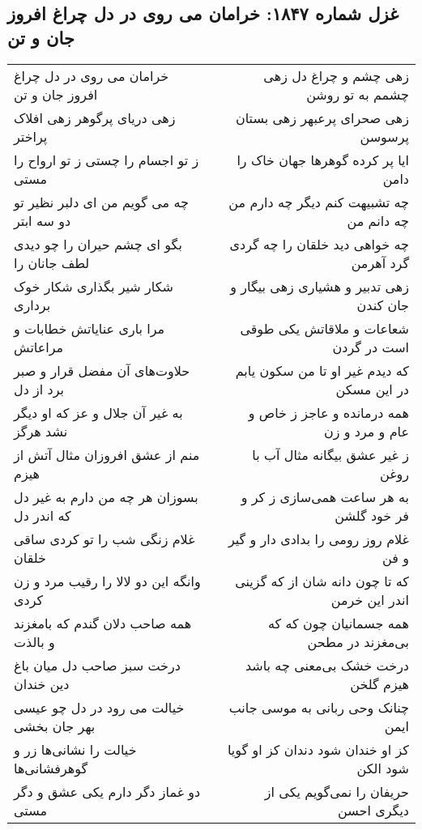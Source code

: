 \begin{center}
\section*{غزل شماره ۱۸۴۷: خرامان می روی در دل چراغ افروز جان و تن}
\label{sec:1847}
\begin{longtable}{l p{0.5cm} r}
خرامان می روی در دل چراغ افروز جان و تن
&&
زهی چشم و چراغ دل زهی چشمم به تو روشن
\\
زهی دریای پرگوهر زهی افلاک پراختر
&&
زهی صحرای پرعبهر زهی بستان پرسوسن
\\
ز تو اجسام را چستی ز تو ارواح را مستی
&&
ایا پر کرده گوهرها جهان خاک را دامن
\\
چه می گویم من ای دلبر نظیر تو دو سه ابتر
&&
چه تشبیهت کنم دیگر چه دارم من چه دانم من
\\
بگو ای چشم حیران را چو دیدی لطف جانان را
&&
چه خواهی دید خلقان را چه گردی گرد آهرمن
\\
شکار شیر بگذاری شکار خوک برداری
&&
زهی تدبیر و هشیاری زهی بیگار و جان کندن
\\
مرا باری عنایاتش خطابات و مراعاتش
&&
شعاعات و ملاقاتش یکی طوقی است در گردن
\\
حلاوت‌های آن مفضل قرار و صبر برد از دل
&&
که دیدم غیر او تا من سکون یابم در این مسکن
\\
به غیر آن جلال و عز که او دیگر نشد هرگز
&&
همه درمانده و عاجز ز خاص و عام و مرد و زن
\\
منم از عشق افروزان مثال آتش از هیزم
&&
ز غیر عشق بیگانه مثال آب با روغن
\\
بسوزان هر چه من دارم به غیر دل که اندر دل
&&
به هر ساعت همی‌سازی ز کر و فر خود گلشن
\\
غلام زنگی شب را تو کردی ساقی خلقان
&&
غلام روز رومی را بدادی دار و گیر و فن
\\
وانگه این دو لالا را رقیب مرد و زن کردی
&&
که تا چون دانه شان از که گزینی اندر این خرمن
\\
همه صاحب دلان گندم که بامغزند و بالذت
&&
همه جسمانیان چون که که بی‌مغزند در مطحن
\\
درخت سبز صاحب دل میان باغ دین خندان
&&
درخت خشک بی‌معنی چه باشد هیزم گلخن
\\
خیالت می رود در دل چو عیسی بهر جان بخشی
&&
چنانک وحی ربانی به موسی جانب ایمن
\\
خیالت را نشانی‌ها زر و گوهرفشانی‌ها
&&
کز او خندان شود دندان کز او گویا شود الکن
\\
دو غماز دگر دارم یکی عشق و دگر مستی
&&
حریفان را نمی‌گویم یکی از دیگری احسن
\\

\end{longtable}
\end{center}
